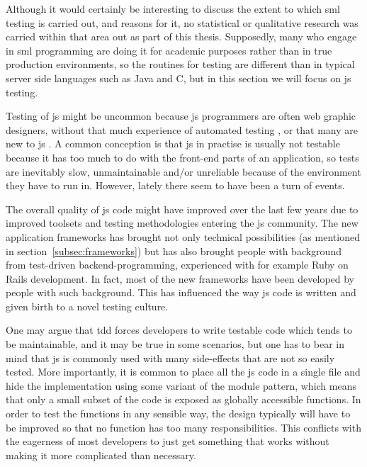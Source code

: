 \documentclass[11pt]{article}
\begin{document}
Although it would certainly be interesting to discuss the extent to which \gls{sml} testing is carried out, and reasons for it, no statistical or qualitative research was carried within that area out as part of this thesis. Supposedly, many who engage in \gls{sml} programming are doing it for academic purposes rather than in true production environments, so the routines for testing are different than in typical server side languages such as Java and C\nolinebreak\hspace{-.05em}\raisebox{.3ex}{\scriptsize\bf \#}, but in this section we will focus on \gls{js} testing.

Testing of \gls{js} might be uncommon because \gls{js} programmers are often web graphic designers, without that much experience of automated testing \cite[question~10]{Stenmark}, or that many are new to \gls{js} \cite[question~16]{Ekelof}. A common conception is that \gls{js} in practise is usually not testable because it has too much to do with the front-end parts of an application, so tests are inevitably slow, unmaintainable and/or unreliable because of the environment they have to run in. However, lately there seem to have been a turn of events.

The overall quality of \gls{js} code might have improved over the last few years due to improved toolsets and testing methodologies entering the \gls{js} community. The new application frameworks has brought not only technical possibilities (as mentioned in section~\ref{subsec:frameworks}) but has also brought people with background from test-driven backend-programming, experienced with for example Ruby on Rails development. In fact, most of the new frameworks have been developed by people with such background. This has influenced the way \gls{js} code is written and given birth to a novel testing culture. \cite[questions~12-15]{Ahnve}

One may argue that \gls{tdd} forces developers to write testable code which tends to be maintainable, and it may be true in some scenarios, but one has to bear in mind that \gls{js} is commonly used with many side-effects that are not so easily tested. More importantly, it is common to place all the \gls{js} code in a single file and hide the implementation using some variant of the module pattern\cite[p.~40]{GoodParts}, which means that only a small subset of the code is exposed as globally accessible functions. In order to test the functions in any sensible way, the design typically will have to be improved so that no function has too many responsibilities. This conflicts with the eagerness of most developers to just get something that works without making it more complicated than necessary.
\end{document}
